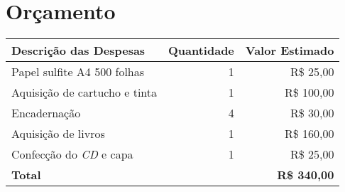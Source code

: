 \section{Orçamento}
\label{sec:orcamento}


\begin{center}
  \tiny
  \begin{tabular}{| l | r | r |}
    \hline
      \textbf{Descrição das Despesas} & \textbf{Quantidade} & \textbf{Valor Estimado} \\
    \hline
      Papel sulfite A4 500 folhas & 1 & R\$ 25,00 \\
    \hline
      Aquisição de cartucho e tinta & 1 & R\$ 100,00 \\
    \hline
      Encadernação & 4 & R\$ 30,00 \\
    \hline
      Aquisição de livros & 1 & R\$ 160,00 \\
    \hline
      Confecção do \emph{CD} e capa & 1 & R\$ 25,00 \\
    \hline
      \textbf{Total} & & \textbf{R\$ 340,00} \\
  \hline
  \end{tabular}
\end{center}

